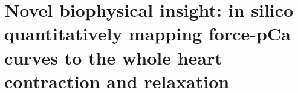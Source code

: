 \chapter{Novel biophysical insight: in silico quantitatively mapping force-pCa curves to the whole heart contraction and relaxation}\label{cha:chapter8}









































